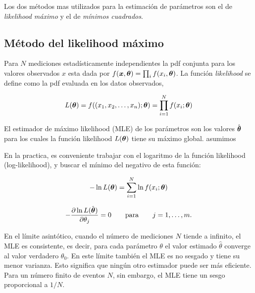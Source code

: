 Los dos métodos mas utilizados para la estimación de parámetros son el de
\emph{likelihood máximo} y el de \emph{mínimos cuadrados}.


\subsection{Método del likelihood máximo}\label{sec:MLE}

Para $N$ mediciones estadísticamente independientes la pdf conjunta para los
valores observados $x$ esta dada por $f(\bm{x}, \bm{\theta}) = \prod_i f(x_i,
\bm{\theta})$. La función \emph{likelihood} se define como la pdf evaluada en los
datos observados,

\begin{equation}
  L(\bm{\theta}) = f((x_1, x_2, \ldots, x_n); \bm{\theta}) = \prod_{i=1}^{N} f(x_i;
  \bm{\theta})
\end{equation}

El estimador de máximo likelihood (MLE) de los parámetros {\btheta} son los
valores $\hat{\bm{\theta}}$ para los cuales la función likelihood $L(\bm{\theta})$ tiene
su máximo global. %
asumimos

En la practica, es conveniente trabajar con el logaritmo de la función
likelihood (log-likelihood), y buscar el mínimo del negativo de esta función:

\begin{equation}
  - \ln L(\bm{\theta}) = \sum_{i=1}^{N} \ln f(x_i; \bm{\theta})
\end{equation}

\begin{equation}
  - \frac{\partial \ln L(\hat{\bm{\theta}})}{\partial \theta_j} = 0 \qquad \text{para} \qquad j =
  1,\ldots,m.
\end{equation}

En el límite asintótico, cuando el número de mediciones $N$ tiende a infinito,
el MLE es consistente, es decir, para cada parámetro $\theta$ el valor estimado
$\hat{\theta}$ converge al valor verdadero $\theta_0$. En este límite también el
MLE es no sesgado y tiene su menor varianza. Esto significa que ningún otro
estimador puede ser más eficiente. Para un número finito de eventos $N$, sin
embargo, el MLE tiene un sesgo proporcional a $1/N$.

